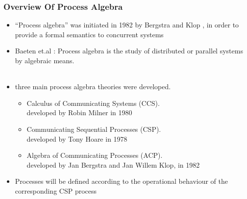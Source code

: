 \documentclass{beamer}
\begin{document}






\begin{frame}
\frametitle{Overview Of Process Algebra } %

\begin{itemize}
\item ``Process algebra'' was initiated in 1982 by Bergstra and Klop \cite{begstraKlop:FixedPointSemantics}, in order to provide a formal semantics to concurrent systems

\end{itemize}

\begin{itemize}
\item Baeten et.al :
 Process algebra is the study of distributed or parallel systems by algebraic means. \\~\\

\end{itemize}



\begin{itemize}
\item three main process algebra theories were developed.

\begin{itemize}

\item Calculus of Communicating Systems (CCS). \\
{\footnotesize developed by Robin Milner in 1980}

\item Communicating Sequential Processes (CSP). \\
{\footnotesize developed by Tony Hoare in 1978  }

\item Algebra of Communicating Processes (ACP). \\
{\footnotesize developed by Jan Bergstra and Jan Willem Klop, in 1982 }

\end{itemize}


\item Processes will be defined according to the operational behaviour of the corresponding CSP process 

\end{itemize}
\end{frame}
\end{document}
